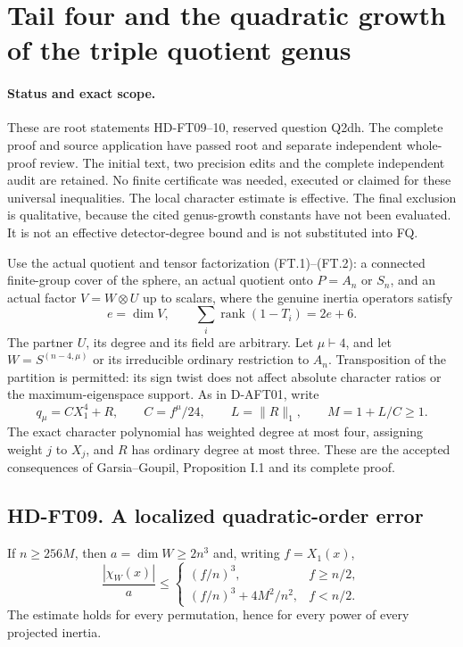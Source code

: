 \section{Tail four and the quadratic growth of the triple quotient genus}
\label{sec:factorwise-four-tail}

\paragraph{Status and exact scope.}
These are root statements HD-FT09--10, reserved question Q2dh.
The complete proof and source application have passed root and separate
independent whole-proof review. The initial text, two precision edits
and the complete independent audit are retained. No finite certificate
was needed, executed or claimed for these universal inequalities.
The local character estimate is effective. The final exclusion is qualitative,
because the cited genus-growth constants have not been evaluated.
It is not an effective detector-degree bound and is not substituted into FQ.

Use the actual quotient and tensor factorization (FT.1)--(FT.2): a connected
finite-group cover of the sphere, an actual quotient onto $P=A_n$ or $S_n$,
and an actual factor $V=W\otimes U$ up to scalars, where the genuine inertia
operators satisfy
\[
 e=\dim V,\qquad \sum_i\operatorname{rank}(1-T_i)=2e+6.
 \tag{FT4.1}
\]
The partner $U$, its degree and its field are arbitrary. Let $\mu\vdash4$,
and let $W=S^{(n-4,\mu)}$ or its irreducible ordinary restriction to $A_n$.
Transposition of the partition is permitted: its sign twist does not affect
absolute character ratios or the maximum-eigenspace support.
As in D-AFT01, write
\[
 q_\mu=CX_1^4+R,\qquad C=f^\mu/24,\qquad
 L=\|R\|_1,\qquad M=1+L/C\ge1.
 \tag{FT4.2}
\]
The exact character polynomial has weighted degree at most four, assigning
weight $j$ to $X_j$, and $R$ has ordinary degree at most three.
These are the accepted consequences of Garsia--Goupil,
Proposition I.1 and its complete proof.\cite{HD:GarsiaGoupil2009}

\subsection*{HD-FT09. A localized quadratic-order error}

\begin{lemma}[HD-FT09]
If $n\ge256M$, then $a=\dim W\ge2n^3$ and, writing $f=X_1(x)$,
\[
 \frac{|\chi_W(x)|}{a}\le
 \begin{cases}
 (f/n)^3,&f\ge n/2,\\
 (f/n)^3+4M^2/n^2,&f<n/2.
 \end{cases}
 \tag{FT4.3}
\]
The estimate holds for every permutation, hence for every power of every
projected inertia.
\end{lemma}

